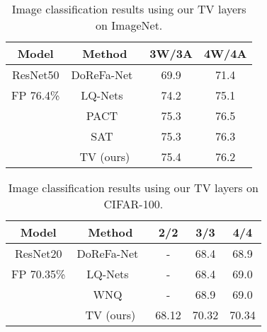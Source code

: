 \documentclass[reqno]{amsart}
\begin{document}
\begin{table}
    \centering
\begin{tabular}{c c c c}
    \toprule
\bfseries Model & \bfseries Method & \bfseries 3W/3A & \bfseries 4W/4A \\ 
\midrule
        ResNet50    & DoReFa-Net~\cite{drfn}      & 69.9                  & 71.4 \\ 
        FP 76.4\%   & LQ-Nets~\cite{zhang2018lqnets}        & 74.2                  & 75.1 \\ 
                  & PACT~\cite{choi2018pact}            & 75.3                  & 76.5  \\ 
                  & SAT~\cite{jin2020scaleadjusted} & 75.3                 & 76.3\\
                  & TV (ours)    & 75.4                 & 76.2 \\
    \bottomrule
\end{tabular}
    \caption{Image classification results using our TV layers on ImageNet.}
    \label{tab:ImageNetTV}
\end{table}

\begin{table}
    \centering
\begin{tabular}{c c c c c}
    \toprule
\bfseries Model & \bfseries Method & \bfseries 2/2  & \bfseries 3/3 & \bfseries 4/4 \\ 
\midrule
        ResNet20      &   DoReFa-Net~\cite{drfn}                 &   -       &   68.4    &   68.9 \\
        FP 70.35\%    &   LQ-Nets~\cite{zhang2018lqnets} &   -       &   68.4   &    69.0 \\
                    &   WNQ~\cite{wnq}                 &   -       &   68.9    &   69.0 \\
                    &   TV (ours)                     &   68.12   &   70.32   &   70.34 \\
    \bottomrule
\end{tabular}
    \caption{Image classification results using our TV layers on CIFAR-100.}
    \label{tab:Cifar100TV}
\end{table}
\end{document}
